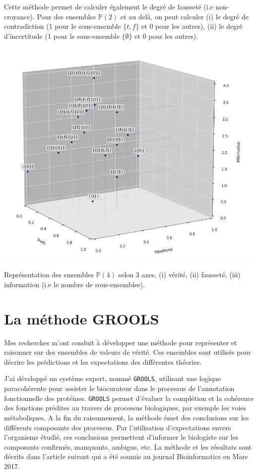 \begin{refsegment}
Cette méthode permet de calculer également le degré de fausseté (i.e non-croyance). Pour des ensembles  $\mathbb{P}(2)$ et au delà, on peut calculer (i) le degré de contradiction (1 pour le sous-ensemble $\{t,f\}$ et 0 pour les autres), (ii) le degré d'incertitude (1 pour le sous-ensemble $\{\emptyset\}$ et 0 pour les autres).

\begin{shadedfigure}[H]
    \centering
    \includegraphics[width=\textwidth]{img/set_3d.png}
    \caption{Représentation des ensembles  $\mathbb{P}(4)$ selon 3 axes, (i) vérité, (ii) fausseté, (iii) information (i.e le nombre de sous-ensembles).}
    \label{fig:set3d}
\end{shadedfigure}

\section{La méthode GROOLS}\label{sec:methode}

Mes recherches m'ont conduit à développer une méthode pour représenter et raisonner sur des ensembles de valeurs de vérité. Ces ensembles sont utilisés pour décrire les prédictions et les expectations des différentes théories.

J'ai développé un système expert, nommé \texttt{\gls{GROOLS}}, utilisant une logique paracohérente pour assister le biocurateur dans le processus de l'annotation fonctionnelle des protéines. \texttt{\gls{GROOLS}} permet d'évaluer la complétion et la cohérence des fonctions prédites au travers de processus biologiques, par exemple les voies métaboliques. A la fin du raisonnement, la méthode émet des conclusions sur les différents composants des processus. Par l'utilisation d'expectations envers l'organisme étudié, ces conclusions permettent d'informer le biologiste sur les composants confirmés, manquants, ambigus, etc. La méthode et les résultats sont décrits dans l'article suivant qui a été soumis au journal Bioinformatics en Mars 2017.


\end{refsegment}
